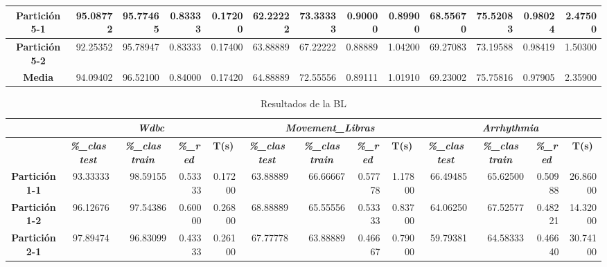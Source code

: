 \documentclass[a4paper,11pt]{article}
\begin{document}
\begin{table}[H]
\begin{adjustbox}{width=1.1\textwidth}
\begin{tabular}{|c|r|r|r|r|r|r|r|r|r|r|r|r|}
    \textbf{Partición 5-1} & 95.08772 & 95.77465 & 0.83333 & 0.17200 & 62.22222 & 73.33333 & 0.90000 & 0.89900 & 68.55670 & 75.52083 & 0.98024 & 2.47500 \\ \hline
    \textbf{Partición 5-2} & 92.25352 & 95.78947 & 0.83333 & 0.17400 & 63.88889 & 67.22222 & 0.88889 & 1.04200 & 69.27083 & 73.19588 & 0.98419 & 1.50300 \\ \hline
    \textbf{Media} & 94.09402 & 96.52100 & 0.84000 & 0.17420 & 64.88889 & 72.55556 & 0.89111 & 1.01910 & 69.23002 & 75.75816 & 0.97905 & 2.35900 \\ \hline
    \end{tabular}
    \end{adjustbox}
    \label{SFS}
  \end{table}
  
   \begin{table}[H]	
    \caption*{Resultados de la BL}
    \begin{adjustbox}{width=1.1\textwidth} 
    \begin{tabular}{|c|r|r|r|r|r|r|r|r|r|r|r|r|}
    \hline
    \multicolumn{1}{|l|}{} & \multicolumn{ 4}{c|}{\textbf{\textit{Wdbc}}} & \multicolumn{ 4}{c|}{\textbf{\textit{Movement\_Libras}}} & \multicolumn{ 4}{c|}{\textbf{\textit{Arrhythmia}}} \\ \hline
    & \multicolumn{1}{c|}{\textbf{\textit{\%\_clas test}}} & \multicolumn{1}{c|}{\textbf{\textit{\%\_clas train}}} & \multicolumn{1}{c|}{\textbf{\textit{\%\_red}}} & \multicolumn{1}{c|}{\textbf{T(s)}} & \multicolumn{1}{c|}{\textbf{\textit{\%\_clas test}}} & \multicolumn{1}{c|}{\textbf{\textit{\%\_clas train}}} & \multicolumn{1}{c|}{\textbf{\textit{\%\_red}}} & \multicolumn{1}{c|}{\textbf{T(s)}} & \multicolumn{1}{c|}{\textbf{\textit{\%\_clas test}}} & \multicolumn{1}{c|}{\textbf{\textit{\%\_clas train}}} & \multicolumn{1}{c|}{\textbf{\textit{\%\_red}}} & \multicolumn{1}{c|}{\textbf{T(s)}} \\ \hline
    \textbf{Partición 1-1} & 93.33333 & 98.59155 & 0.53333 & 0.17200 & 63.88889 & 66.66667 & 0.57778 & 1.17800 & 66.49485 & 65.62500 & 0.50988 & 26.86000 \\ \hline
    \textbf{Partición 1-2} & 96.12676 & 97.54386 & 0.60000 & 0.26800 & 68.88889 & 65.55556 & 0.53333 & 0.83700 & 64.06250 & 67.52577 & 0.48221 & 14.32000 \\ \hline
    \textbf{Partición 2-1} & 97.89474 & 96.83099 & 0.43333 & 0.26100 & 67.77778 & 63.88889 & 0.46667 & 0.79000 & 59.79381 & 64.58333 & 0.46640 & 30.74100 \\ \hline

\end{tabular}
\end{adjustbox}
\end{table}
\end{document}
